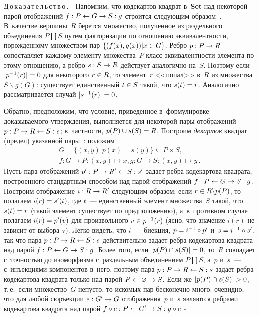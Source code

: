 \begin{multicols}{2}
   \noindent
   Д\,о\,к\,а\,з\,а\,т\,е\,л\,ь\,с\,т\,в\,о\,.\ \ Напомним, что кодекартов квадрат 
в~\textbf{Set} над некоторой парой отображений $f : P \hm\leftarrow G\hm\to S : g$ 
строится следующим образом~\cite[разд.~3.3]{16-kov}. В~качестве 
вершины~$R$ берется множество, полученное из раздельного объединения $P 
\coprod  S$ путем факторизации по отношению эквивалентности, 
порожденному множеством пар $\{(f(x), g(x)) \vert x \hm\in G\}$. Ребро $p : P 
\hm\to R$ сопоставляет каждому элементу множества~$P$ класс 
эквивалентности элемента по этому отношению, а ребро $s : S \hm\to R$ 
действует аналогично на~$S$. Поэтому если $\vert p^{-1}(r)\vert  \hm= 0$ для 
некоторого $r\hm\in R$, то элемент~$r$ <<попал>> в~$R$ из множества~$S 
\backslash g(G)$: существует единственный $t \hm\in S$ такой, что $s(t) \hm= r$. 
Аналогично рассматривается случай $\vert s^{-1}(r)\vert\hm = 0$.
   
   Обратно, предположим, что условие, приведен\-ное в~формулировке 
доказываемого утверждения,\linebreak
 выполняется для некоторой пары отображений $p 
: P \hm\to R \hm\leftarrow S : s$; в~частности, $p(P) \cup s(S) \hm= R$. Построим 
\textit{декартов} квадрат (предел) указанной пары~\cite[разд.~3.4]{16-kov}: 
положим 
\begin{multline*}
G = \{(x, y) \vert p(x) = s(y)\} \subseteq  P \times S,\\
 f : G 
\to P : (x, y) \mapsto x, g : G \to S : (x, y) \mapsto y\,.
\end{multline*}
 Пусть пара 
отображений $p^\prime : P \hm\to R^\prime\hm\leftarrow S : s^\prime$ задает 
ребра кодекартова квадрата, построенного стандартным способом над парой 
отображений $f : P \hm\leftarrow G \hm\to S : g$. Построим отоб\-ра\-же\-ние $i : R 
\hm\to R^\prime$ следующим образом: если $r\hm\in R \backslash p(P)$, то 
полагаем $i(r) \hm= s^\prime(t)$, где $t$~--- единственный элемент 
множества~$S$ такой, что $s(t) \hm= r$ (такой элемент существует по 
предположению), а~в~противном случае полагаем $i(r) \hm= p^\prime(v)$ для 
произвольного $v\hm\in p^{-1}(r)$ (ясно, что значение $i(r)$ не зависит от 
выбора v). Легко видеть, что $i$~--- биекция, $p\hm= i^{-1}\circ p^\prime$ 
и~$s\hm = i^{-1}\circ  s^\prime$, так что пара $p : P \hm\to R \hm\leftarrow S : s$ 
действительно задает ребра кодекартова квадрата над парой $f : P \hm\leftarrow 
G \hm\to S : g$. Более того, если $\vert p(P) \cap  s(S)\vert\hm = 0$, то~$R$ 
совпадает с~точностью до изоморфизма с~раздельным объединением $P\coprod 
S$, а~$p$ и~$s$~--- с~инъекциями компонентов в~него, поэтому пара $p : P 
\hm\to R \hm\leftarrow S : s$ задает ребра кодекартова квадрата только над парой 
$P\hm\leftarrow \varnothing\hm\to S$. Если же $\vert p(P) \cap  s(S)\vert \hm> 0$, 
т.\,е.\ если множество~$G$ непусто, то искомых пар бесконечно много: 
очевидно, что для любой сюръекции $e : G^\prime\hm\to G$ отображения~$p$ 
и~$s$ являются ребрами кодекартова квадрата над парой $f \circ e : P 
\hm\leftarrow G^\prime\hm\to S : g \circ e$.\hfill$\square$
{

}
\end{multicols}
